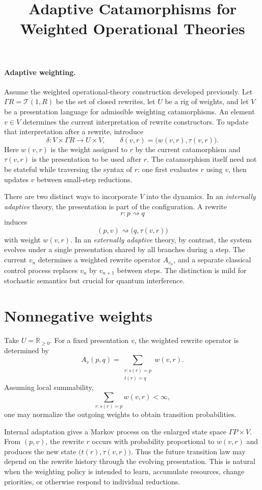 \documentclass[10pt]{article}
\title{\vspace{-1.6em}Adaptive Catamorphisms for Weighted Operational Theories}
\author{}
\date{\vspace{-2em}}
\newcommand{\T}{\mathcal{T}}
\newcommand{\Rnn}{\mathbb{R}_{\ge 0}}
\begin{document}
\maketitle
\vspace{-1em}

\paragraph{Adaptive weighting.}
Assume the weighted operational-theory construction developed previously.
Let $\Gamma R=\T(1,R)$ be the set of closed rewrites, let $U$ be a rig of
weights, and let $V$ be a presentation language for admissible weighting
catamorphisms.  An element $v\in V$ determines the current interpretation of
rewrite constructors.  To update that interpretation after a rewrite, introduce
\[
\delta:V\times \Gamma R\longrightarrow U\times V,
\qquad
\delta(v,r)=\bigl(w(v,r),\tau(v,r)\bigr).
\]
Here $w(v,r)$ is the weight assigned to $r$ by the current catamorphism and
$\tau(v,r)$ is the presentation to be used after $r$.  The catamorphism itself
need not be stateful while traversing the syntax of $r$: one first evaluates
$r$ using $v$, then updates $v$ between small-step reductions.

There are two distinct ways to incorporate $V$ into the dynamics.  In an
\emph{internally adaptive} theory, the presentation is part of the
configuration.  A rewrite
\[
r:p\rightsquigarrow q
\]
induces
\[
(p,v)\rightsquigarrow \bigl(q,\tau(v,r)\bigr)
\]
with weight $w(v,r)$.  In an \emph{externally adaptive} theory, by contrast,
the system evolves under a single presentation shared by all branches during
a step.  The current $v_n$ determines a weighted rewrite operator $A_{v_n}$,
and a separate classical control process replaces $v_n$ by $v_{n+1}$ between
steps.  The distinction is mild for stochastic semantics but crucial for
quantum interference.

\section*{Nonnegative weights}

Take $U=\Rnn$.  For a fixed presentation $v$, the weighted rewrite operator is
determined by
\[
A_v(p,q)
=
\sum_{\substack{r:s(r)=p\\t(r)=q}} w(v,r).
\]
Assuming local summability,
\[
\sum_{r:s(r)=p}w(v,r)<\infty,
\]
one may normalize the outgoing weights to obtain transition probabilities.

Internal adaptation gives a Markov process on the enlarged state space
$\Gamma P\times V$.  From $(p,v)$, the rewrite $r$ occurs with probability
proportional to $w(v,r)$ and produces the new state
$\bigl(t(r),\tau(v,r)\bigr)$.  Thus the future transition law may depend on the
rewrite history through the evolving presentation.  This is natural when the
weighting policy is intended to learn, accumulate resources, change priorities,
or otherwise respond to individual reductions.
\end{document}
